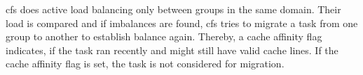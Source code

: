\gls{cfs} does active load balancing only between groups in the same domain.
Their load is compared and if imbalances are found, \gls{cfs} tries to migrate
a task from one group to another to establish balance again.
Thereby, a cache affinity flag indicates, if the task ran recently and might
still have valid cache lines.
If the cache affinity flag is set, the task is not considered for migration.
